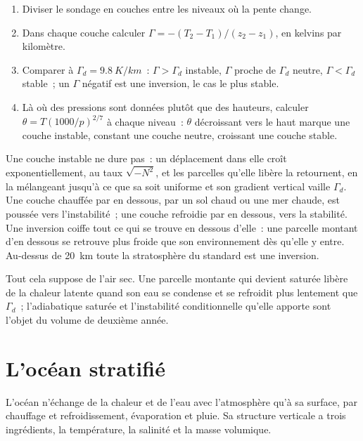 \begin{method}\label{met:b1:fluid-envelopes-structure:sounding}
\begin{enumerate}
  \item Diviser le sondage en couches entre les niveaux où la pente change.
  \item Dans chaque couche calculer $\Gamma = -(T_2 - T_1)/(z_2 - z_1)$, en kelvins par
        kilomètre.
  \item Comparer à $\Gamma_d = \qty{9.8}{K/km}$~: $\Gamma > \Gamma_d$ instable,
        $\Gamma$ proche de $\Gamma_d$ neutre, $\Gamma < \Gamma_d$ stable~; un
        $\Gamma$ négatif est une inversion, le cas le plus stable.
  \item Là où des pressions sont données plutôt que des hauteurs, calculer $\theta =
        T(1000/p)^{2/7}$ à chaque niveau~: $\theta$ décroissant vers le haut marque une
        couche instable, constant une couche neutre, croissant une couche stable.
\end{enumerate}
\end{method}

Une couche instable ne dure pas~: un déplacement dans elle croît exponentiellement, au
taux $\sqrt{-N^2}$, et les parcelles qu'elle libère la retournent, en la mélangeant jusqu'à ce que
sa  soit uniforme et son gradient vertical vaille $\Gamma_d$. Une couche
chauffée par en dessous, par un sol chaud ou une mer chaude, est poussée vers l'instabilité~;
une couche refroidie par en dessous, vers la stabilité. Une inversion coiffe tout ce qui se trouve en
dessous d'elle~: une parcelle montant d'en dessous se retrouve plus froide que son environnement dès
qu'elle y entre. Au-dessus de \qty{20}{km} toute la stratosphère du standard est une
inversion.

Tout cela suppose de l'air sec. Une parcelle montante qui devient saturée libère
de la chaleur latente quand son eau se condense et se refroidit plus lentement que $\Gamma_d$~;
l'adiabatique saturée et l'instabilité conditionnelle qu'elle apporte sont l'objet du
volume de deuxième année.

\section{L'océan stratifié}\label{sec:b1:fluid-envelopes-structure:ocean}

L'océan n'échange de la chaleur et de l'eau avec l'atmosphère qu'à sa surface,
par chauffage et refroidissement, évaporation et pluie. Sa structure verticale a
trois ingrédients, la température, la salinité et la masse volumique.

